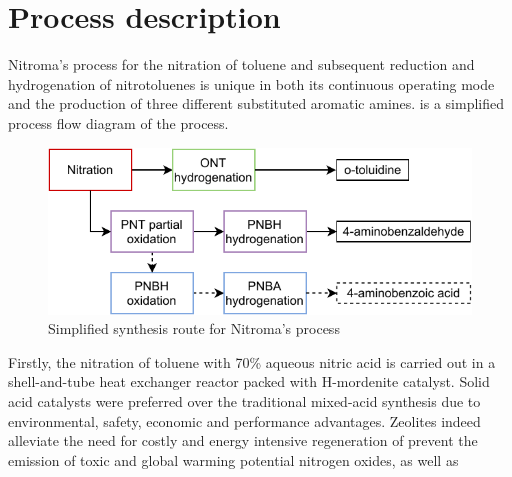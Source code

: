 \section{Process description}

Nitroma's process for the nitration of toluene and subsequent reduction and hydrogenation of nitrotoluenes is unique in both its continuous operating mode and the production of three different substituted aromatic amines.   is a simplified process flow diagram of the process.
\begin{figure}
    \centering
    \includegraphics{chapters/0-executive-summary/figures/BFD_nitroma-Page-3.pdf}
    \caption{Simplified synthesis route for Nitroma's process}
    \label{fig:BFD-ES}
\end{figure}
Firstly, the nitration of toluene with 70\% aqueous nitric acid is carried out in a shell-and-tube heat exchanger reactor packed with H-mordenite catalyst. Solid acid catalysts were preferred over the traditional mixed-acid synthesis due to environmental, safety, economic and performance advantages. Zeolites indeed alleviate the need for costly and energy intensive regeneration of  prevent the emission of toxic and global warming potential nitrogen oxides, as well as 






